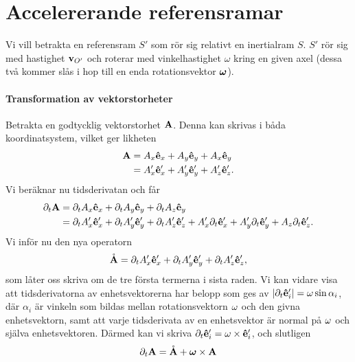 \section{Accelererande referensramar}

Vi vill betrakta en referensram $S'$ som rör sig relativt en inertialram $S$. $S'$ rör sig med hastighet $\vb{v}_{O'}$ och roterar med vinkelhastighet $\omega$ kring en given axel (dessa två kommer slås i hop till en enda rotationsvektor $\vb*{\omega}$).

\paragraph{Transformation av vektorstorheter}
Betrakta en godtycklig vektorstorhet $\vb{A}$. Denna kan skrivas i båda koordinatsystem, vilket ger likheten
\begin{align*}
	\vb{A} &= A_{x}\vu{e}_{x} + A_{y}\vu{e}_{y} + A_{x}\vu{e}_{y} \\
	       &= A_{x}'\vu{e}_{x}' + A_{y}'\vu{e}_{y}' + A_{z}'\vu{e}_{z}'.
\end{align*}
Vi beräknar nu tidsderivatan och får
\begin{align*}
	\partial_{t}\vb{A} &= \partial_{t}A_{x}\vu{e}_{x} + \partial_{t}A_{y}\vu{e}_{y} + \partial_{t}A_{z}\vu{e}_{y} \\
	       &= \partial_{t}A_{x}'\vu{e}_{x}' + \partial_{t}A_{y}'\vu{e}_{y}' + \partial_{t}A_{z}'\vu{e}_{z}' + A_{x}'\partial_{t}\vu{e}_{x}' + A_{y}'\partial_{t}\vu{e}_{y}' + A_{z}\partial_{t}\vu{e}_{z}'.
\end{align*}
Vi inför nu den nya operatorn
\begin{align*}
	\mathring{\vb{A}} = \partial_{t}A_{x}'\vu{e}_{x}' + \partial_{t}A_{y}'\vu{e}_{y}' + \partial_{t}A_{z}'\vu{e}_{z}',
\end{align*}
som låter oss skriva om de tre första termerna i sista raden. Vi kan vidare visa att tidsderivatorna av enhetsvektorerna har belopp som ges av $\abs{\partial_{t}\vu{e}_{i}'} = \omega\sin{\alpha_i}$, där $\alpha_i$ är vinkeln som bildas mellan rotationsvektorn $\vb{\omega}$ och den givna enhetsvektorn, samt att varje tidsderivata av en enhetsvektor är normal på $\vb{\omega}$ och själva enhetsvektoren. Därmed kan vi skriva $\partial_{t}\vu{e}_{i}' = \vb{\omega}\times\vu{e}_{i}'$, och slutligen
\begin{align}
	\partial_{t}\vb{A} = \mathring{\vb{A}} + \vb*{\omega}\times\vb{A}
	\label{eq:relderiv}
\end{align}

